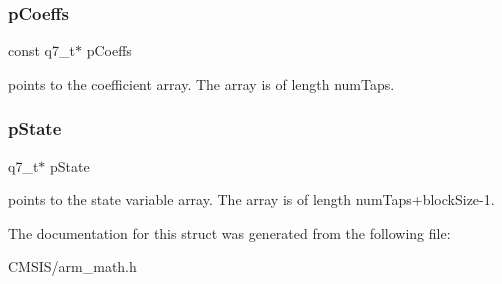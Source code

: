 \subsubsection{\texorpdfstring{pCoeffs}{pCoeffs}}
{\footnotesize\ttfamily const q7\+\_\+t$\ast$ p\+Coeffs}

points to the coefficient array. The array is of length num\+Taps. \mbox{\label{structarm__fir__instance__q7_aa8f67102521b620af6f259afdcf29785}} 
\subsubsection{\texorpdfstring{pState}{pState}}
{\footnotesize\ttfamily q7\+\_\+t$\ast$ p\+State}

points to the state variable array. The array is of length num\+Taps+block\+Size-\/1. 

The documentation for this struct was generated from the following file\+:\begin{DoxyCompactItemize}
\item 
C\+M\+S\+I\+S/arm\+\_\+math.\+h\end{DoxyCompactItemize}
